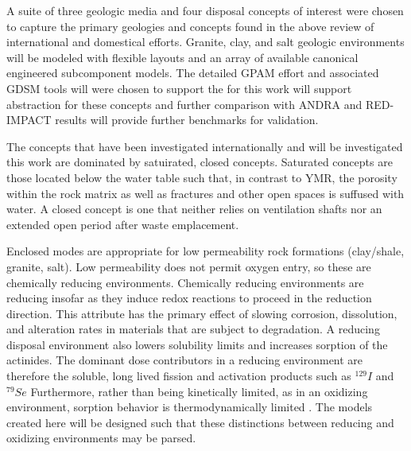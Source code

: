{%



A suite of three geologic media and four disposal concepts of interest were
chosen to capture the primary geologies and concepts found in the above review 
of international and domestical efforts. Granite, clay, and salt geologic 
environments will be modeled with flexible layouts and an array of available 
canonical engineered subcomponent models.  The detailed \gls{GPAM} effort and 
associated \gls{GDSM} tools will were chosen to support the for this work will 
support abstraction for these concepts and further comparison with \gls{ANDRA} 
and RED-IMPACT results will provide further benchmarks for validation.  

The concepts that have been investigated internationally and will be
investigated this work are dominated by satuirated, closed concepts. Saturated 
concepts are those located below the water table such that, in contrast to 
\gls{YMR}, the porosity within the rock matrix as well as fractures 
and other open spaces is suffused with water. A closed concept is one that 
neither relies on ventilation shafts nor an extended open period after waste 
emplacement.

Enclosed modes are appropriate for low permeability rock formations (clay/shale, 
granite, salt).  Low permeability does not permit oxygen entry, so these are
chemically reducing environments.  Chemically reducing environments are reducing 
insofar as they induce  redox reactions to proceed in the reduction direction. This 
attribute has the primary effect of slowing corrosion, dissolution, and  
alteration rates in materials that are subject to degradation. A reducing 
disposal environment also lowers solubility limits and increases sorption of the 
actinides. The dominant dose contributors in a reducing environment are 
therefore the soluble, long lived fission and activation products such as $^{129}I$ 
and $^{79}Se$ \cite{NEA , von_lensa_red-impact_2008}
Furthermore, rather than being kinetically limited, as in an oxidizing 
environment, sorption behavior is thermodynamically limited 
\cite{nutt_personal_2011 , schwartz_fundamentals_2004}. The models created here 
will be designed such that these distinctions between reducing and oxidizing 
environments may be parsed. 

}
